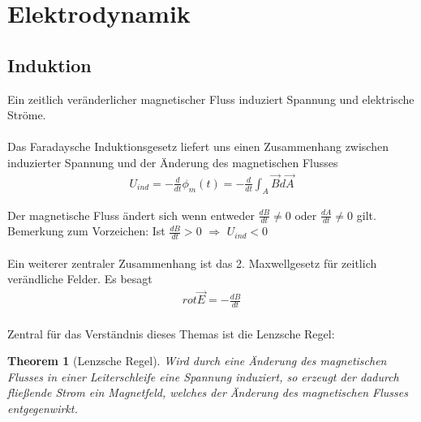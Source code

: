 \documentclass[a4paper,12pt]{report}
\newtheorem{theorem}{Theorem}
\begin{document}
\section{Elektrodynamik}
\subsection{Induktion}

Ein zeitlich veränderlicher magnetischer Fluss induziert Spannung und elektrische Ströme. \\ \\
Das Faradaysche Induktionsgesetz liefert uns einen Zusammenhang zwischen induzierter Spannung und der Änderung des magnetischen Flusses 
\begin{align}
U_{ind} = - \frac{d}{dt} \phi_m(t) = - \frac{d}{dt} \int_{A} \vec{B}d\vec{A}
\end{align}

Der magnetische Fluss ändert sich wenn entweder $\frac{dB}{dt} \neq 0$ oder $\frac{dA}{dt} \neq 0$ gilt. \\
Bemerkung zum Vorzeichen: Ist $\frac{dB}{dt} > 0 $ $\Rightarrow$ $ U_{ind} < 0$ \\ \\
Ein weiterer zentraler Zusammenhang ist das 2. Maxwellgesetz für zeitlich verändliche Felder. Es besagt 
\begin{align}
rot \vec{E} = - \frac{dB}{dt}
\end{align} 
\\
Zentral für das Verständnis dieses Themas ist die Lenzsche Regel:
\begin{theorem}[Lenzsche Regel]
Wird durch eine Änderung des magnetischen Flusses in einer Leiterschleife eine Spannung induziert, so erzeugt der dadurch fließende Strom ein Magnetfeld, welches der Änderung des magnetischen Flusses entgegenwirkt.
\end{theorem}
\end{document}
